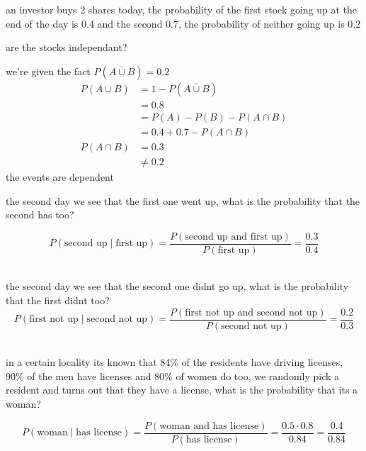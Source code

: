 \documentclass[a4paper,12pt]{article}
\begin{document}
\begin{question}
an investor buys 2 shares today, the probability of the first stock going up at the end of the day is 0.4 and the second 0.7, the probability of neither going up is 0.2\\
\begin{subquestion}
are the stocks independant?\\
\begin{answer}
we're given the fact \(P(\overline{A \cup B}) = 0.2\)\\
\begin{align*}
  P(A \cup B) &= 1 - P(\overline{A \cup B})\\
  &= 0.8\\
  &= P(A) - P(B) - P(A \cap B)\\
  &= 0.4 + 0.7 - P(A \cap B)\\
  P(A \cap B) &= 0.3\\
  &\neq 0.2
\end{align*}
the events are dependent\\
\end{answer}
\end{subquestion}
\begin{subquestion}
the second day we see that the first one went up, what is the probability that the second has too?\\
\begin{answer}
\[
P(\text{second up} \mid \text{first up}) = \frac{P(\text{second up and first up})}{P(\text{first up})} = \frac{0.3}{0.4}
\]\\
\end{answer}
\end{subquestion}
\begin{subquestion}
the second day we see that the second one didnt go up, what is the probability that the first didnt too?\\
\[
P(\text{first not up} \mid \text{second not up}) = \frac{P(\text{first not up and second not up})}{P(\text{second not up})} = \frac{0.2}{0.3}
\]\\
\end{subquestion}
\end{question}

\begin{question}
in a certain locality its known that 84\% of the residents have driving licenses, 90\% of the men have licenses and 80\% of women do too, we randomly pick a resident and turns out that they have a license, what is the probability that its a woman?\\
\begin{answer}
\[
P(\text{woman} \mid \text{has license}) = \frac{P(\text{woman and has license})}{P(\text{has license})} = \frac{0.5 \cdot 0.8}{0.84} = \frac{0.4}{0.84}
\]\\
\end{answer}
\end{question}
\end{document}
